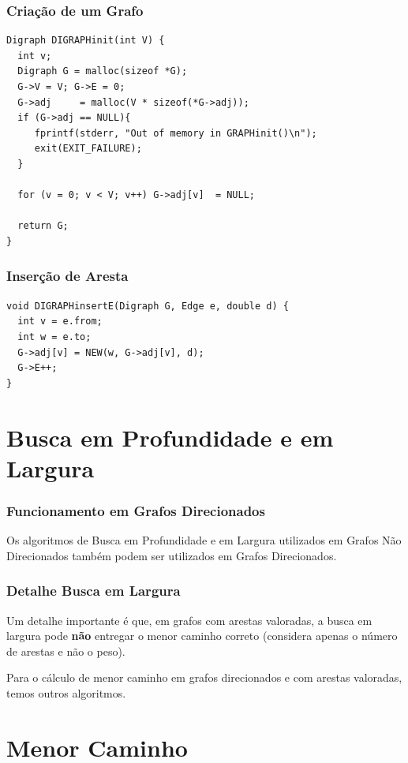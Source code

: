 \documentclass{beamer}
\begin{document}
\begin{frame}[fragile]
  \frametitle{Criação de um Grafo}

\begin{verbatim}
Digraph DIGRAPHinit(int V) {
  int v;
  Digraph G = malloc(sizeof *G);
  G->V = V; G->E = 0;
  G->adj     = malloc(V * sizeof(*G->adj));
  if (G->adj == NULL){
     fprintf(stderr, "Out of memory in GRAPHinit()\n");
     exit(EXIT_FAILURE);
  }

  for (v = 0; v < V; v++) G->adj[v]  = NULL;

  return G;
}
\end{verbatim}
\end{frame}

\begin{frame}[fragile]
  \frametitle{Inserção de Aresta}

\begin{verbatim}
void DIGRAPHinsertE(Digraph G, Edge e, double d) {
  int v = e.from;
  int w = e.to;
  G->adj[v] = NEW(w, G->adj[v], d);
  G->E++;
}
\end{verbatim}

\end{frame}

\section{Busca em Profundidade e em Largura}

\begin{frame}[c]
  \frametitle{Funcionamento em Grafos Direcionados}

  
  Os algoritmos de Busca em Profundidade e em Largura utilizados em Grafos Não Direcionados
  também podem ser utilizados em Grafos Direcionados.
\end{frame}

\begin{frame}[c]
  \frametitle{Detalhe Busca em Largura}

  Um detalhe importante é que, em grafos com arestas valoradas, a busca em largura pode \textbf{não} entregar
  o menor caminho correto (considera apenas o número de arestas e não o peso).

  Para o cálculo de menor caminho em grafos direcionados e com arestas valoradas, temos outros algoritmos.
\end{frame}

\section{Menor Caminho}
\end{document}
